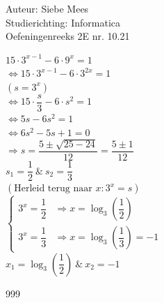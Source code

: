\documentclass[a4paper]{article}
\begin{document}
  
\noindent \large Auteur: Siebe Mees \\
\noindent \large Studierichting: Informatica \\
\noindent \large Oefeningenreeks 2E nr. 10.21 \\

\medskip

\normalsize

$ 15 \cdot 3^{x-1} - 6 \cdot 9^x = 1 $ \\

$ \Leftrightarrow 15 \cdot 3^{x-1} - 6 \cdot 3^{2x} = 1 $ \\

$ \left( s = 3^x \right) $ \\

$ \Leftrightarrow 15 \cdot \dfrac{s}{3} - 6 \cdot s^2 = 1 $ \\

$ \Leftrightarrow 5s - 6s^2 = 1 $ \\

$ \Leftrightarrow 6s^2 - 5s + 1 = 0 $ \\

$ \Rightarrow s = \dfrac{5 \pm \sqrt{25-24}}{12} = \dfrac{5 \pm 1}{12} $ \\

$ s_1 = \dfrac{1}{2} \  \& \ s_2 = \dfrac{1}{3} $ \\
 
$ \left( \text{Herleid terug naar } x: 3^x = s \right) $ \\

$ \left\{
\begin{array}{ll}
	\displaystyle 3^x = \dfrac{1}{2} & \Rightarrow x = \displaystyle \log_3 \left(\dfrac{1}{2}\right) \\
	\displaystyle 3^x = \dfrac{1}{3} & \Rightarrow x = \displaystyle \log_3 \left(\dfrac{1}{3}\right) = -1
\end{array}
\right.$ \\

$ x_1 = \log_3 \left(\dfrac{1}{2}\right) \  \& \ x_2 = -1 $ \\


\begin{thebibliography}{999}
\end{thebibliography}
\end{document}

